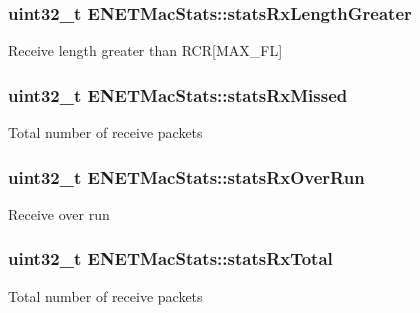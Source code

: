 \subsubsection[{\texorpdfstring{stats\+Rx\+Length\+Greater}{statsRxLengthGreater}}]{\setlength{\rightskip}{0pt plus 5cm}uint32\+\_\+t E\+N\+E\+T\+Mac\+Stats\+::stats\+Rx\+Length\+Greater}\hypertarget{structENETMacStats_a4ce7bf7e3f50a2d07134fb9436f86106}{}\label{structENETMacStats_a4ce7bf7e3f50a2d07134fb9436f86106}
Receive length greater than R\+CR\mbox{[}M\+A\+X\+\_\+\+FL\mbox{]} 
\subsubsection[{\texorpdfstring{stats\+Rx\+Missed}{statsRxMissed}}]{\setlength{\rightskip}{0pt plus 5cm}uint32\+\_\+t E\+N\+E\+T\+Mac\+Stats\+::stats\+Rx\+Missed}\hypertarget{structENETMacStats_a4dc0edd0e2da923b713c5a78a8e70197}{}\label{structENETMacStats_a4dc0edd0e2da923b713c5a78a8e70197}
Total number of receive packets 
\subsubsection[{\texorpdfstring{stats\+Rx\+Over\+Run}{statsRxOverRun}}]{\setlength{\rightskip}{0pt plus 5cm}uint32\+\_\+t E\+N\+E\+T\+Mac\+Stats\+::stats\+Rx\+Over\+Run}\hypertarget{structENETMacStats_a28e89d6333af2dab10d6259c26e095c2}{}\label{structENETMacStats_a28e89d6333af2dab10d6259c26e095c2}
Receive over run 
\subsubsection[{\texorpdfstring{stats\+Rx\+Total}{statsRxTotal}}]{\setlength{\rightskip}{0pt plus 5cm}uint32\+\_\+t E\+N\+E\+T\+Mac\+Stats\+::stats\+Rx\+Total}\hypertarget{structENETMacStats_ae85b2e4a6f12e5a72ce7e4eedbfd69cf}{}\label{structENETMacStats_ae85b2e4a6f12e5a72ce7e4eedbfd69cf}
Total number of receive packets 
